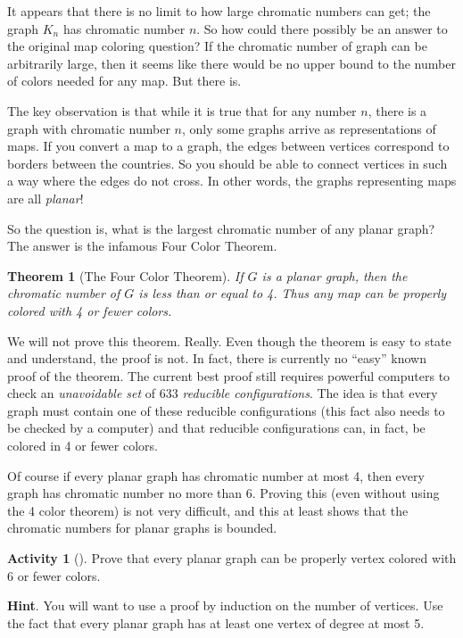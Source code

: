 \documentclass[10pt,]{book}
\theoremstyle{plain}
\newtheorem{theorem}{Theorem}[section]
\theoremstyle{definition}
\theoremstyle{definition}
\theoremstyle{definition}
\newtheorem{activity}[project]{Activity}
\numberwithin{equation}{chapter}
\begin{document}
\hypertarget{p-344}{}%
It appears that there is no limit to how large chromatic numbers can get; the graph \(K_n\) has chromatic number \(n\). So how could there possibly be an answer to the original map coloring question? If the chromatic number of graph can be arbitrarily large, then it seems like there would be no upper bound to the number of colors needed for any map. But there is.%
\par
\hypertarget{p-345}{}%
The key observation is that while it is true that for any number \(n\), there is a graph with chromatic number \(n\), only some graphs arrive as representations of maps. If you convert a map to a graph, the edges between vertices correspond to borders between the countries. So you should be able to connect vertices in such a way where the edges do not cross. In other words, the graphs representing maps are all \emph{planar}!%
\par
\hypertarget{p-346}{}%
So the question is, what is the largest chromatic number of any planar graph? The answer is the infamous Four Color Theorem.%
\begin{theorem}[{The Four Color Theorem}]\label{theorem-5}
\hypertarget{p-347}{}%
 If \(G\) is a planar graph, then the chromatic number of \(G\) is less than or equal to 4. Thus any map can be properly colored with 4 or fewer colors.%
\end{theorem}
\hypertarget{p-348}{}%
We will not prove this theorem. Really. Even though the theorem is easy to state and understand, the proof is not. In fact, there is currently no ``easy'' known proof of the theorem. The current best proof still requires powerful computers to check an \emph{unavoidable set} of 633 \emph{reducible configurations}. The idea is that every graph must contain one of these reducible configurations (this fact also needs to be checked by a computer) and that reducible configurations can, in fact, be colored in 4 or fewer colors.%
\par
\hypertarget{p-349}{}%
Of course if every planar graph has chromatic number at most 4, then every graph has chromatic number no more than 6.  Proving this (even without using the 4 color theorem) is not very difficult, and this at least shows that the chromatic numbers for planar graphs is bounded.%
\begin{activity}[]\label{activity-31}
\hypertarget{p-350}{}%
Prove that every planar graph can be properly vertex colored with 6 or fewer colors.%
\par\smallskip%
\noindent\textbf{Hint}.\hypertarget{hint-11}{}\quad%
\hypertarget{p-351}{}%
You will want to use a proof by induction on the number of vertices.  Use the fact that every planar graph has at least one vertex of degree at most 5.%
\end{activity}
\end{document}

